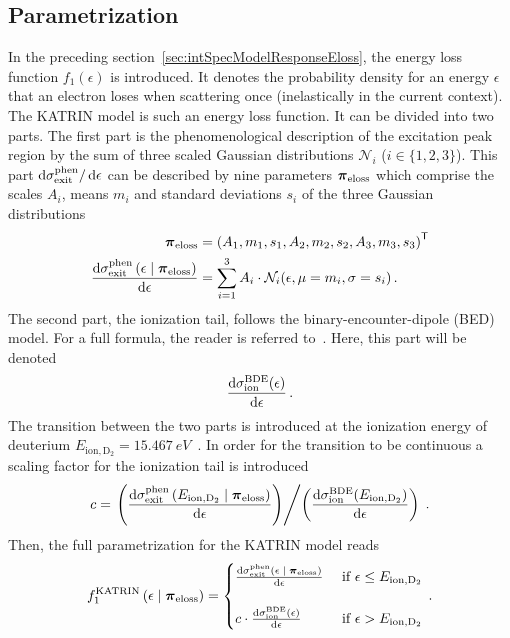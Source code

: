 \subsection{Parametrization}
In the preceding section~\ref{sec:intSpecModelResponseEloss}, the energy loss function $f_1(\epsilon)$ is introduced. It denotes the probability density for an energy $\epsilon$ that an electron loses when scattering once (inelastically in the current context). The KATRIN model is such an energy loss function. It can be divided into two parts. The first part is the phenomenological description of the excitation peak region by the sum of three scaled Gaussian distributions $\mathcal{N}_i$ ($i \in \{1,2,3\}$). This part $\mathop{}\!\mathrm{d}\sigma_\mathrm{exit}^\mathrm{phen}/\mathop{}\!\mathrm{d} \epsilon$  can be described by nine parameters $\boldsymbol{\mathbf{\pi}}_\mathrm{eloss}$ which comprise the scales $A_i$, means $m_i$ and standard deviations $s_i$ of the three Gaussian distributions~\cite{Hannen2019_2}
\newcommand{\katrinElossPhen}[1]{
	\frac{
		\d\sigma_\mathrm{exit}^\mathrm{phen}\giventhat*{#1}{\nuisanceParamVec_\mathrm{eloss}}
	}{
		\d \epsilon
	}
}
\begin{align}
\label{eq:katrinElossElossModelParams}
\nuisanceParamVec_\mathrm{eloss} &= 
\transp{\left(
	A_1, m_1, s_1, 
	A_2, m_2, s_2, 
	A_3, m_3, s_3
	\right)} \\
\katrinElossPhen{\epsilon} &=
\sum_{i=1}^3 A_i \cdot \mathcal{N}_i(\epsilon, \mu=m_i, \sigma=s_i)
\fullstop
\end{align}
The second part, the ionization tail, follows the binary-encounter-dipole (BED) model. For a full formula, the reader is referred to~\cite{Kim1994}. Here, this part will be denoted
\newcommand{\katrinElossBDE}[1]{
	\frac{
		\d \sigma_\mathrm{ion}^\mathrm{BDE}(#1)
	}{
		\d \epsilon
	}
}
\begin{equation}
	\katrinElossBDE{\epsilon}
	\fullstop
\end{equation}%
\newcommand{\ionEnergyDeu}{E_\mathrm{ion,D_2}}%
The transition between the two parts is introduced at the ionization energy of deuterium $\ionEnergyDeu=\SI{15.467}{eV}$~\cite{Shiner1993}. In order for the transition to be continuous a scaling factor for the ionization tail is introduced
\begin{equation}
c = \left.	
	\left(
		\katrinElossPhen{\ionEnergyDeu}
	\right)
\middle/
	\left(
		\katrinElossBDE{\ionEnergyDeu}
	\right)
\right.
\fullstop
\end{equation}
Then, the full parametrization for the KATRIN model reads~\cite{Hannen2019_1}
\begin{equation}
	f_1^\mathrm{KATRIN}
	\giventhat*{\epsilon}{\nuisanceParamVec_\mathrm{eloss}} = 
	\begin{cases}
	\katrinElossPhen{\epsilon}
	&\text{ if } \epsilon \leq E_\mathrm{ion,D_2} \\
	\vphantom{.} & \\
	c \cdot \katrinElossBDE{\epsilon} 
	&\text{ if } \epsilon > E_\mathrm{ion,D_2}
	\end{cases}
	\fullstop
\end{equation}

